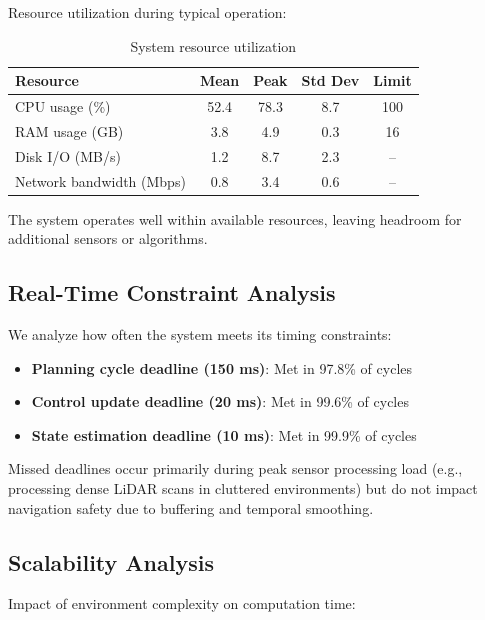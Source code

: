 Resource utilization during typical operation:

\begin{table}[htbp]
\centering
\caption{System resource utilization}
\label{tab:exp_resource_usage}
\begin{tabular}{lcccc}
\toprule
\textbf{Resource} & \textbf{Mean} & \textbf{Peak} & \textbf{Std Dev} & \textbf{Limit} \\
\midrule
CPU usage (\%) & 52.4 & 78.3 & 8.7 & 100 \\
RAM usage (GB) & 3.8 & 4.9 & 0.3 & 16 \\
Disk I/O (MB/s) & 1.2 & 8.7 & 2.3 & -- \\
Network bandwidth (Mbps) & 0.8 & 3.4 & 0.6 & -- \\
\bottomrule
\end{tabular}
\end{table}

The system operates well within available resources, leaving headroom for additional sensors or algorithms.

\subsection{Real-Time Constraint Analysis}

We analyze how often the system meets its timing constraints:

\begin{itemize}
    \item \textbf{Planning cycle deadline (150 ms)}: Met in 97.8\% of cycles
    \item \textbf{Control update deadline (20 ms)}: Met in 99.6\% of cycles
    \item \textbf{State estimation deadline (10 ms)}: Met in 99.9\% of cycles
\end{itemize}

Missed deadlines occur primarily during peak sensor processing load (e.g., processing dense LiDAR scans in cluttered environments) but do not impact navigation safety due to buffering and temporal smoothing.


\subsection{Scalability Analysis}

Impact of environment complexity on computation time:

